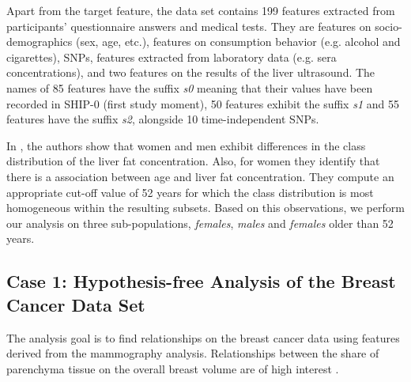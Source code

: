 \documentclass[journal]{style/vgtc} 			          %
\begin{document}
Apart from the target feature, the data set contains 199 features extracted from participants' questionnaire answers and medical tests.
They are features on socio-demographics (sex, age, etc.), features on consumption behavior (e.g. alcohol and cigarettes), SNPs, features extracted from laboratory data (e.g. sera concentrations), and two features on the results of the liver ultrasound.
The names of 85 features have the suffix \emph{s0} meaning that their values have been recorded in SHIP-0 (first study moment), 50 features exhibit the suffix \emph{s1} and 55 features have the suffix \emph{s2}, alongside 10 time-independent SNPs.

In \cite{Niemann2014}, the authors show that women and men exhibit differences in the class distribution of the liver fat concentration.
Also, for women they identify that there is a association between age and liver fat concentration.
They compute an appropriate cut-off value of 52 years for which the class distribution is most homogeneous within the resulting subsets.
Based on this observations, we perform our analysis on three sub-populations, \emph{females}, \emph{males} and \emph{females} older than 52 years.
\subsection{Case 1: Hypothesis-free Analysis of the Breast Cancer Data Set}
The analysis goal is to find relationships on the breast cancer data using features derived from the mammography analysis.
Relationships between the share of parenchyma tissue on the overall breast volume are of high interest \cite{Mccormack2006}.
\end{document}

